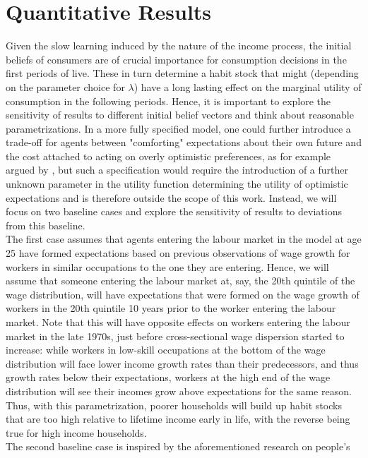 \section{Quantitative Results}\label{sec:qr}
Given the slow learning induced by the nature of the income process, the initial 
beliefs of consumers are of crucial importance for consumption decisions in the 
first periods of live. These in turn determine a habit stock that might (depending
 on the parameter choice for $\lambda$) have a long lasting effect on the marginal 
utility of consumption in the following periods. Hence, it is important to explore
 the sensitivity of results to different initial belief vectors and think about 
reasonable parametrizations. In a more fully specified model, one could further
 introduce a trade-off for agents between "comforting" expectations about their 
own future and the cost attached to acting on overly optimistic preferences, as 
for example argued by \citet{Glaeser2004}, but such a specification would require
 the introduction of a further unknown parameter in the utility function determining
 the utility of optimistic expectations and is therefore outside the scope of 
this work. Instead, we will focus on two baseline cases and explore the 
sensitivity of results to deviations from this baseline. \\
The first case assumes that agents entering the labour market in the model at age
 25 have formed expectations based on previous observations of wage growth for 
workers in similar occupations to the one they are entering. Hence, we will assume
 that someone entering the labour market at, say, the 20th quintile of the wage 
distribution, will have expectations that were formed on the wage growth of 
workers in the 20th quintile 10 years prior to the worker entering the labour 
market. Note that this will have opposite effects on workers entering the labour
 market in the late 1970s, just before cross-sectional wage dispersion started 
to increase: while workers in low-skill occupations at the bottom of the wage 
distribution will face lower income growth rates than their predecessors, and 
thus growth rates below their expectations, workers at the high end of the wage 
distribution will see their incomes grow above expectations for the same reason. 
Thus, with this parametrization, poorer households will build up habit stocks 
that are too high relative to lifetime income early in life, with the reverse 
being true for high income households. \\
The second baseline case is inspired by the aforementioned research on people's 
